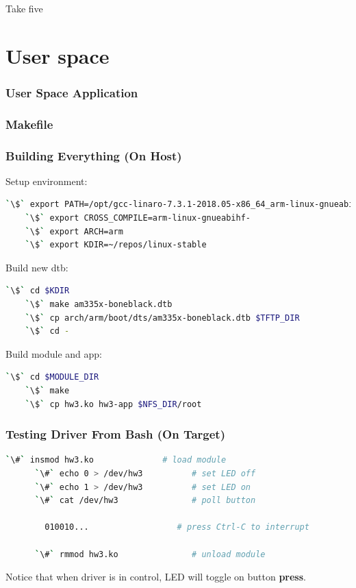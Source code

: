 \documentclass[aspectratio=169,usenames,dvipsnames]{beamer}
\newcounter{cont}
\begin{document}
\begin{frame}[standout]
  Take five
\end{frame}

\section{User space}

\begin{frame}[containsverbatim,allowframebreaks=1]
  \frametitle{User Space Application}
  
\end{frame}

\begin{frame}[containsverbatim]
  \frametitle{Makefile}
  
  \vspace*{-5mm}
\end{frame}

\begin{frame}[containsverbatim]
  \frametitle{Building Everything (On Host)}
  Setup environment:
  \begin{lstlisting}[language=bash,numbers=none]
    `\$` export PATH=/opt/gcc-linaro-7.3.1-2018.05-x86_64_arm-linux-gnueabihf/bin:$PATH
    `\$` export CROSS_COMPILE=arm-linux-gnueabihf-
    `\$` export ARCH=arm
    `\$` export KDIR=~/repos/linux-stable
  \end{lstlisting}
  Build new dtb:
  \begin{lstlisting}[language=bash,numbers=none]
    `\$` cd $KDIR
    `\$` make am335x-boneblack.dtb
    `\$` cp arch/arm/boot/dts/am335x-boneblack.dtb $TFTP_DIR
    `\$` cd -
  \end{lstlisting}
  Build module and app:
  \begin{lstlisting}[language=bash,numbers=none]
    `\$` cd $MODULE_DIR
    `\$` make
    `\$` cp hw3.ko hw3-app $NFS_DIR/root
  \end{lstlisting}
\end{frame}

\begin{frame}[containsverbatim]
  \frametitle{Testing Driver From Bash (On Target)}
  \begin{lstlisting}[language=bash,numbers=none]
      `\#` insmod hw3.ko              # load module
      `\#` echo 0 > /dev/hw3          # set LED off
      `\#` echo 1 > /dev/hw3          # set LED on
      `\#` cat /dev/hw3               # poll button

        010010...                  # press Ctrl-C to interrupt

      `\#` rmmod hw3.ko               # unload module
  \end{lstlisting}
  Notice that when driver is in control, LED will toggle on button
  \textbf{press}.
\end{frame}
\end{document}
